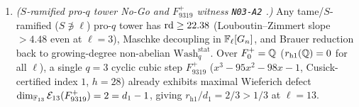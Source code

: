 \begin{theorem}
\begin{enumerate}[label=\textup{(\roman*)}]
\item \emph{($S$-ramified pro-$q$ tower No-Go and $F_{9319}^+$ witness \texttt{N03-A2} \tagObs{}.)} Any tame/$S$-ramified ($S \not\ni \ell$) pro-$q$ tower has $\mathrm{rd} \ge 22.38$ (Louboutin--Zimmert slope $> 4.48$ even at $\ell = 3$), Maschke decoupling in $\mathbb{F}_\ell[G_n]$, and Brauer reduction back to growing-degree non-abelian $\mathrm{Wash}_q^{\mathrm{stat}}$. Over $F_0^+ = \mathbb{Q}$ ($r_{\mathrm{h1}}(\mathbb{Q}) = 0$ for all $\ell$), a single $q = 3$ cyclic cubic step $F_{9319}^+$ ($x^3 - 95x^2 - 98x - 1$, Cusick-certified index $1$, $h=28$) already exhibits maximal Wieferich defect $\dim_{\mathbb{F}_{13}}\mathcal{E}_{13}(F_{9319}^+) = 2 = d_1 - 1$, giving $r_{\mathrm{h1}}/d_1 = 2/3 > 1/3$ at $\ell = 13$.
\end{enumerate}
\end{theorem}


